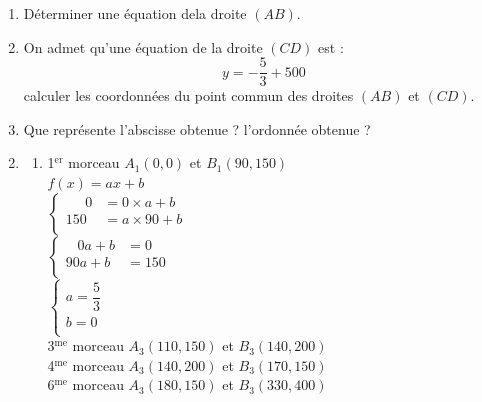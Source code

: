 \begin{enumerate}
         \begin{enumerate}
            \item Déterminer une équation dela droite $(AB)$. 
            \item On admet qu'une équation de la droite $(CD)$ est : \\
                   \[ y=-\dfrac{5}{3} +500 \]
                  calculer les coordonnées du point commun des droites $(AB)$ et $(CD)$. 
            \item Que représente l'abscisse obtenue ? l'ordonnée obtenue ? 
         \end{enumerate}                 
\end{enumerate}

\begin{enumerate}
    \setcounter{enumi}{1}
    \item 
     \begin{enumerate}
       \item  1$^{\mathrm{er}}$ morceau $A_1(0,0)$ et $B_1(90,150)$ \\

        $f(x) = ax + b$ \\

        $\begin{cases}
        \;\;\;\;\; 0 \!\!\!\!\!\!\!\!&= 0\times a +b\\
         150 \!\!\!\!\!\!\!\!&= a \times 90 + b\\
        \end{cases} $ \\


        $\begin{cases}
        \;\;\; 0a +b \!\!\!\!\!\!\!\!&= 0\\
        90a + b \!\!\!\!\!\!\!\!&= 150 \\
        \end{cases} $ \\


        $\begin{cases}
        a = \dfrac{5}{3}\\
        b = 0 \\
        \end{cases} $ \\

        3$^{\mathrm{me}}$ morceau $A_3(110,150)$ et $B_3(140,200)$ \\
        4$^{\mathrm{me}}$ morceau $A_3(140,200)$ et $B_3(170,150)$ \\
        6$^{\mathrm{me}}$ morceau $A_3(180,150)$ et $B_3(330,400)$ \\
\bigskip 


\end{enumerate}
\end{enumerate}
